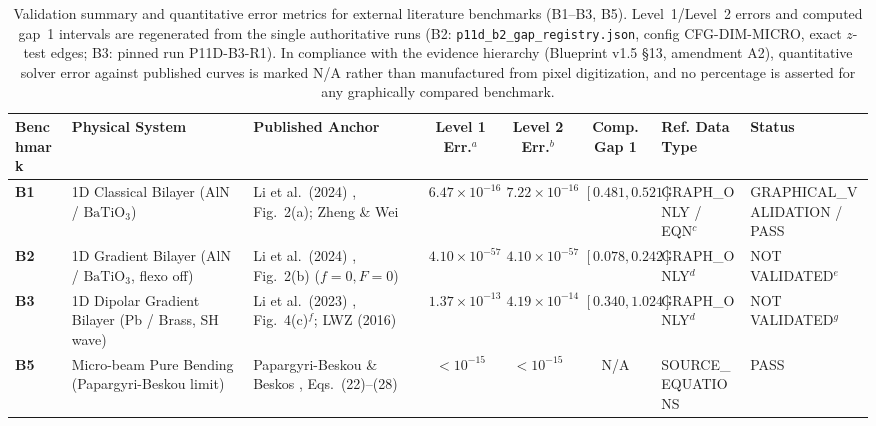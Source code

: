 \begin{table}[t]
\centering
\caption{Validation summary and quantitative error metrics for external literature benchmarks (B1--B3, B5). Level~1/Level~2 errors and computed gap~1 intervals are regenerated from the single authoritative runs (B2: \texttt{p11d\_b2\_gap\_registry.json}, config CFG-DIM-MICRO, exact $z$-test edges; B3: pinned run P11D-B3-R1). In compliance with the evidence hierarchy (Blueprint v1.5 \S13, amendment A2), quantitative solver error against published curves is marked N/A rather than manufactured from pixel digitization, and no percentage is asserted for any graphically compared benchmark.}
\label{tab:anchor_errors}
\footnotesize
\renewcommand{\arraystretch}{1.2}
\setlength{\tabcolsep}{2pt}
\begin{tabularx}{\textwidth}{@{}l >{\raggedright\arraybackslash}X >{\raggedright\arraybackslash}X ccc >{\raggedright\arraybackslash}p{2.0cm} >{\raggedright\arraybackslash}p{2.4cm}@{}}
\hline\hline
\textbf{Benchmark} & \textbf{Physical System} & \textbf{Published Anchor} & \textbf{Level 1 Err.}$^a$ & \textbf{Level 2 Err.}$^b$ & \textbf{Comp. Gap 1} & \textbf{Ref. Data Type} & \textbf{Status} \\
\hline
\textbf{B1} & 1D Classical Bilayer (AlN / $\mathrm{BaTiO_3}$) & Li et al.\ (2024) \cite{li2024anchorB}, Fig.~2(a); Zheng \& Wei \cite{zhengwei2009} & $6.47 \times 10^{-16}$ & $7.22 \times 10^{-16}$ & $[0.481, 0.521]$ & GRAPH\_\hspace{0pt}ONLY / EQN$^c$ & GRAPHICAL\_\hspace{0pt}VALIDATION / PASS \\
\textbf{B2} & 1D Gradient Bilayer (AlN / $\mathrm{BaTiO_3}$, flexo off) & Li et al.\ (2024) \cite{li2024anchorB}, Fig.~2(b) ($f=0, F=0$) & $4.10 \times 10^{-57}$ & $4.10 \times 10^{-57}$ & $[0.078, 0.242]$ & GRAPH\_\hspace{0pt}ONLY$^d$ & NOT VALIDATED$^e$ \\
\textbf{B3} & 1D Dipolar Gradient Bilayer (Pb / Brass, SH wave) & Li et al.\ (2023) \cite{li2023anchorA}, Fig.~4(c)$^f$; LWZ (2016) \cite{liweizhou2016} & $1.37 \times 10^{-13}$ & $4.19 \times 10^{-14}$ & $[0.340, 1.024]$ & GRAPH\_\hspace{0pt}ONLY$^d$ & NOT VALIDATED$^g$ \\
\textbf{B5} & Micro-beam Pure Bending (Papargyri-Beskou limit) & Papargyri-Beskou \& Beskos \cite{papargyribeskou2009}, Eqs.~(22)--(28) & $< 10^{-15}$ & $< 10^{-15}$ & N/A & SOURCE\_\hspace{0pt}EQUATIONS & PASS \\

\end{tabularx}
\end{table}
